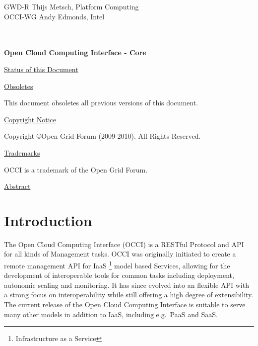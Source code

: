 \documentclass[10pt,a4paper]{article}
\begin{document}
\thispagestyle{empty}

GWD-R \hfill  Thijs Metsch, Platform Computing\\
OCCI-WG \hfill  Andy Edmonds, Intel\\
\\
\\

\vspace*{0.5in}

\begin{Large}
\textbf{Open Cloud Computing Interface - Core}
\end{Large}

\vspace*{0.5in}

\underline{Status of this Document}



\underline{Obsoletes}

This document obsoletes all previous versions of this document.

\underline{Copyright Notice}

Copyright \copyright Open Grid Forum (2009-2010). All Rights Reserved.

\underline{Trademarks}

OCCI is a trademark of the Open Grid Forum.

\underline{Abstract}



\newpage
\tableofcontents
\newpage

\section{Introduction}
The Open Cloud Computing Interface (OCCI) is a RESTful Protocol and
API for all kinds of Management tasks. OCCI was originally initiated
to create a remote management API for IaaS%
\footnote{Infrastructure as a Service}
model based Services, allowing for the development of interoperable tools for
common tasks including deployment, autonomic scaling and monitoring.
%
It has since evolved into an flexible API with a strong focus on
interoperability while still offering a high degree of extensibility. The
current release of the Open Cloud Computing Interface is suitable to serve many
other models in addition to IaaS, including e.g.~PaaS and SaaS.
\end{document}
